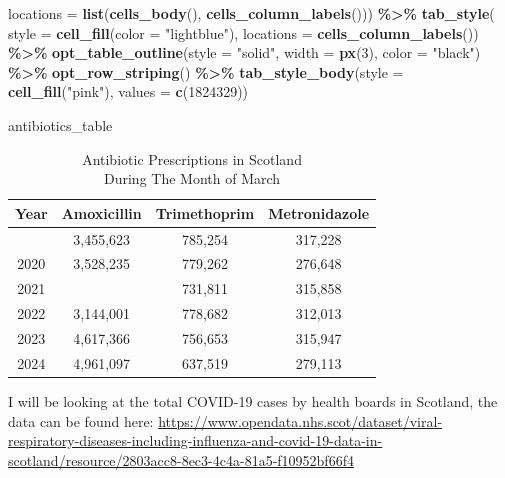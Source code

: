 \documentclass[
]{article}
\newenvironment{Shaded}{\begin{snugshade}}{\end{snugshade}}
\newcommand{\AttributeTok}[1]{\textcolor[rgb]{0.13,0.29,0.53}{#1}}
\newcommand{\DecValTok}[1]{\textcolor[rgb]{0.00,0.00,0.81}{#1}}
\newcommand{\FunctionTok}[1]{\textcolor[rgb]{0.13,0.29,0.53}{\textbf{#1}}}
\newcommand{\NormalTok}[1]{#1}
\newcommand{\SpecialCharTok}[1]{\textcolor[rgb]{0.81,0.36,0.00}{\textbf{#1}}}
\newcommand{\StringTok}[1]{\textcolor[rgb]{0.31,0.60,0.02}{#1}}
\begin{document}
\begin{Shaded}
\begin{Highlighting}[]
    \AttributeTok{locations =} \FunctionTok{list}\NormalTok{(}\FunctionTok{cells\_body}\NormalTok{(), }\FunctionTok{cells\_column\_labels}\NormalTok{())) }\SpecialCharTok{\%\textgreater{}\%}
  \FunctionTok{tab\_style}\NormalTok{(}
    \AttributeTok{style =} \FunctionTok{cell\_fill}\NormalTok{(}\AttributeTok{color =} \StringTok{"lightblue"}\NormalTok{),}
    \AttributeTok{locations =} \FunctionTok{cells\_column\_labels}\NormalTok{()) }\SpecialCharTok{\%\textgreater{}\%}
  \FunctionTok{opt\_table\_outline}\NormalTok{(}\AttributeTok{style =} \StringTok{"solid"}\NormalTok{, }\AttributeTok{width =} \FunctionTok{px}\NormalTok{(}\DecValTok{3}\NormalTok{), }\AttributeTok{color =} \StringTok{"black"}\NormalTok{) }\SpecialCharTok{\%\textgreater{}\%}
  \FunctionTok{opt\_row\_striping}\NormalTok{() }\SpecialCharTok{\%\textgreater{}\%} 
  \FunctionTok{tab\_style\_body}\NormalTok{(}\AttributeTok{style =} \FunctionTok{cell\_fill}\NormalTok{(}\StringTok{"pink"}\NormalTok{), }\AttributeTok{values =} \FunctionTok{c}\NormalTok{(}\DecValTok{1824329}\NormalTok{))}

\NormalTok{antibiotics\_table}
\end{Highlighting}
\end{Shaded}

\begin{table}[!t]
\caption*{
{\large Antibiotic Prescriptions in Scotland} \\ 
{\small During The Month of March}
} 
\fontsize{12.0pt}{14.4pt}\selectfont
\begin{tabular*}{\linewidth}{@{\extracolsep{\fill}}cccc}
\toprule
Year & Amoxicillin & Trimethoprim & Metronidazole \\ 
\midrule\addlinespace[2.5pt]
{2019} & {3,455,623} & {785,254} & {317,228} \\ 
{2020} & {3,528,235} & {779,262} & {276,648} \\ 
{2021} & {\cellcolor[HTML]{FFC0CB}{1,824,329}} & {731,811} & {315,858} \\ 
{2022} & {3,144,001} & {778,682} & {312,013} \\ 
{2023} & {4,617,366} & {756,653} & {315,947} \\ 
{2024} & {4,961,097} & {637,519} & {279,113} \\ 
\bottomrule
\end{tabular*}
\end{table}

I will be looking at the total COVID-19 cases by health boards in
Scotland, the data can be found here:
\url{https://www.opendata.nhs.scot/dataset/viral-respiratory-diseases-including-influenza-and-covid-19-data-in-scotland/resource/2803acc8-8ec3-4c4a-81a5-f10952bf66f4}
\end{document}

